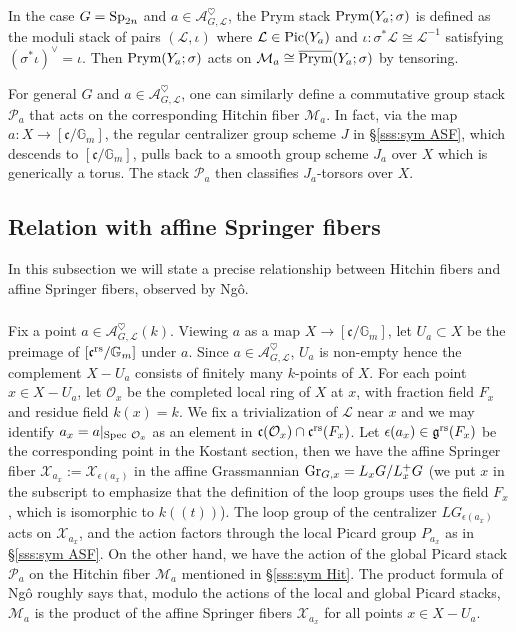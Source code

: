 \documentclass[]{pcmi}
\let\oldsubsubsection\subsubsection
\renewcommand{\subsubsection}[1]{%
\setcounter{subsubsection}{\value{equation}}%
\oldsubsubsection{#1}%
\refstepcounter{equation}%
}
\theoremstyle{plain}
\theoremstyle{definition}
\def\GG{\mathbb{G}}
\def\calA{\mathcal{A}}
\def\calL{\mathcal{L}}
\def\calM{\mathcal{M}}
\def\calO{\mathcal{O}}
\def\calP{\mathcal{P}}
\newcommand{\sX}{\ensuremath{\mathscr{X}}\xspace}
\newcommand{\sX}{\ensuremath{\mathcal{X}}\xspace}
\newcommand\frc{\mathfrak{c}}
\newcommand\frg{\mathfrak{g}}
\newcommand{\Gr}{\textup{Gr}}
\newcommand{\Pic}{\textup{Pic}}
\newcommand\rs{\textup{rs}}
\newcommand\Spec{\textup{Spec}\ }
\newcommand\Sp{\textup{Sp}}
\newcommand{\Gm}{\GG_m}
\newcommand{\ep}{\epsilon}
\newcommand{\lr}[1]{(\!(#1)\!)}
\newcommand{\Ah}{\calA^{\heartsuit}}
\newcommand{\Prym}{\textup{Prym}}
\newcommand{\cPrym}{\overline{\textup{Prym}}}
\begin{document}
In the case $G=\Sp_{2n}$ and $a\in\Ah_{G,\calL}$, the Prym stack $\Prym(Y_{a};\sigma)$ is defined as the moduli stack of pairs $(\calL,\iota)$ where $\calL\in\Pic(Y_{a})$ and $\iota:\sigma^*\calL\cong\calL^{-1}$ satisfying $(\sigma^{*}\iota)^{\vee}=\iota$. Then $\Prym(Y_{a};\sigma)$ acts on $\calM_{a}\cong\cPrym(Y_{a};\sigma)$ by tensoring.

For general $G$ and $a\in\Ah_{G,\calL}$, one can similarly define a commutative group stack $\calP_{a}$ that acts on the corresponding Hitchin fiber $\calM_{a}$. In fact, via the map $a:X\to [\frc/\Gm]$, the regular centralizer group scheme $J$ in \S\ref{sss:sym ASF}, which descends to $[\frc/\Gm]$, pulls back to a smooth group scheme $J_{a}$ over $X$ which is generically a torus. The stack $\calP_{a}$ then classifies $J_{a}$-torsors over $X$. 


\subsection{Relation with affine Springer fibers}\label{ss:rel Hit ASF}
In this subsection we will state a precise relationship between Hitchin fibers and affine Springer fibers, observed by Ng\^o. 

\subsubsection{} Fix a point $a\in\Ah_{G,\calL}(k)$. Viewing $a$ as a map $X\to [\frc/\Gm]$, let $U_{a}\subset X$ be the preimage of $[\frc^{\rs}/\Gm]$ under $a$. Since $a\in\Ah_{G,\calL}$, $U_{a}$ is non-empty hence the complement $X-U_{a}$ consists of finitely many $k$-points of $X$.  For each point $x\in X-U_{a}$, let $\calO_{x}$ be the completed local ring of $X$ at $x$, with fraction field $F_{x}$ and residue field $k(x)=k$.  We fix a trivialization of $\calL$ near $x$ and we may identify $a_{x}=a|_{\Spec\calO_{x}}$ as an element in $\frc(\calO_{x})\cap\frc^{\rs}(F_{x})$. Let $\ep(a_{x})\in\frg^{\rs}(F_{x})$ be the corresponding point in the Kostant section, then we have the affine Springer fiber $\sX_{a_{x}}:=\sX_{\ep(a_{x})}$ in the affine Grassmannian $\Gr_{G, x}=L_{x}G/L^{+}_{x}G$ (we put $x$ in the subscript to emphasize that the definition of the loop groups uses the field $F_{x}$, which is isomorphic to $k\lr{t}$). The loop group of the centralizer $LG_{\ep(a_{x})}$ acts on $\sX_{a_{x}}$, and the action  factors through the local Picard group $P_{a_{x}}$ as in \S\ref{sss:sym ASF}. On the other hand, we have the action of the global Picard stack $\calP_{a}$ on the Hitchin fiber $\calM_{a}$ mentioned in \S\ref{sss:sym Hit}. The product formula of Ng\^o roughly says that, modulo the actions of the local and global Picard stacks, $\calM_{a}$ is the product of the affine Springer fibers $\sX_{a_{x}}$ for all points $x\in X-U_{a}$.
\end{document}
